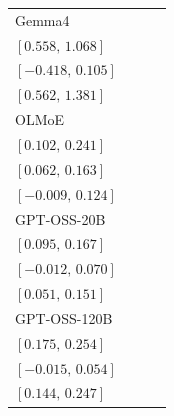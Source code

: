 \begin{tabular*}{\linewidth}{@{\extracolsep{\fill}}lccc@{}}
Gemma4 & \begin{tabular}[t]{@{}c@{}}\(0.805\)\\\([0.558,\,1.068]\)\end{tabular} & \begin{tabular}[t]{@{}c@{}}\(-0.157\)\\\([-0.418,\,0.105]\)\end{tabular} & \begin{tabular}[t]{@{}c@{}}\(0.961\)\\\([0.562,\,1.381]\)\end{tabular}\\[2pt]
OLMoE & \begin{tabular}[t]{@{}c@{}}\(0.169\)\\\([0.102,\,0.241]\)\end{tabular} & \begin{tabular}[t]{@{}c@{}}\(0.111\)\\\([0.062,\,0.163]\)\end{tabular} & \begin{tabular}[t]{@{}c@{}}\(0.057\)\\\([-0.009,\,0.124]\)\end{tabular}\\[2pt]
GPT-OSS-20B & \begin{tabular}[t]{@{}c@{}}\(0.130\)\\\([0.095,\,0.167]\)\end{tabular} & \begin{tabular}[t]{@{}c@{}}\(0.030\)\\\([-0.012,\,0.070]\)\end{tabular} & \begin{tabular}[t]{@{}c@{}}\(0.100\)\\\([0.051,\,0.151]\)\end{tabular}\\[2pt]
GPT-OSS-120B & \begin{tabular}[t]{@{}c@{}}\(0.213\)\\\([0.175,\,0.254]\)\end{tabular} & \begin{tabular}[t]{@{}c@{}}\(0.019\)\\\([-0.015,\,0.054]\)\end{tabular} & \begin{tabular}[t]{@{}c@{}}\(0.194\)\\\([0.144,\,0.247]\)\end{tabular}\\[2pt]
\bottomrule
\end{tabular*}
\endgroup
